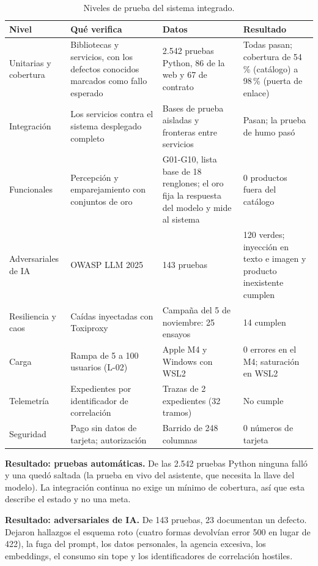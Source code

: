 \begin{table}[htbp]
\centering
\small
\caption{Niveles de prueba del sistema integrado.}
\label{tab:niveles-prueba}
\begin{tabularx}{\textwidth}{@{}p{2.3cm}XXX@{}}
\toprule
Nivel & Qué verifica & Datos & Resultado \\
\midrule
Unitarias y cobertura & Bibliotecas y servicios, con los defectos conocidos marcados como fallo esperado & 2.542 pruebas Python, 86 de la web y 67 de contrato & Todas pasan; cobertura de 54\,\% (catálogo) a 98\,\% (puerta de enlace) \\
Integración & Los servicios contra el sistema desplegado completo & Bases de prueba aisladas y fronteras entre servicios & Pasan; la prueba de humo pasó \\
Funcionales & Percepción y emparejamiento con conjuntos de oro & G01-G10, lista base de 18 renglones; el oro fija la respuesta del modelo y mide al sistema & 0 productos fuera del catálogo \\
Adversariales de IA & OWASP LLM 2025 & 143 pruebas & 120 verdes; inyección en texto e imagen y producto inexistente cumplen \\
Resiliencia y caos & Caídas inyectadas con Toxiproxy & Campaña del 5 de noviembre: 25 ensayos & 14 cumplen \\
Carga & Rampa de 5 a 100 usuarios (L-02) & Apple M4 y Windows con WSL2 & 0 errores en el M4; saturación en WSL2 \\
Telemetría & Expedientes por identificador de correlación & Trazas de 2 expedientes (32 tramos) & No cumple \\
Seguridad & Pago sin datos de tarjeta; autorización & Barrido de 248 columnas & 0 números de tarjeta \\
\bottomrule
\end{tabularx}
\end{table}

\textbf{Resultado: pruebas automáticas.} De las 2.542 pruebas Python ninguna falló y una quedó saltada
(la prueba en vivo del asistente, que necesita la llave del modelo). La integración continua no exige un
mínimo de cobertura, así que esta describe el estado y no una meta.

\textbf{Resultado: adversariales de IA.} De 143 pruebas, 23 documentan un defecto. Dejaron hallazgos el
esquema roto (cuatro formas devolvían error 500 en lugar de 422), la fuga del prompt, los datos personales, la
agencia excesiva, los embeddings, el consumo sin tope y los identificadores de correlación hostiles.

